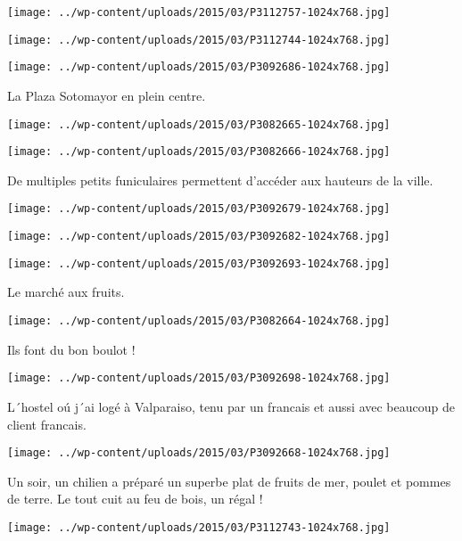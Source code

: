 \centerline{\texttt{[image: ../wp-content/uploads/2015/03/P3112757-1024x768.jpg]} } 
 \newline
\centerline{\texttt{[image: ../wp-content/uploads/2015/03/P3112744-1024x768.jpg]} } 
 \newline
\centerline{\texttt{[image: ../wp-content/uploads/2015/03/P3092686-1024x768.jpg]} } 
 \newline
 La Plaza Sotomayor en plein centre. \newline
 \newline
\centerline{\texttt{[image: ../wp-content/uploads/2015/03/P3082665-1024x768.jpg]} } 
 \newline
\centerline{\texttt{[image: ../wp-content/uploads/2015/03/P3082666-1024x768.jpg]} } 
 \newline
 De multiples petits funiculaires permettent d'accéder aux hauteurs de la ville. \newline
 \newline
\centerline{\texttt{[image: ../wp-content/uploads/2015/03/P3092679-1024x768.jpg]} } 
 \newline
\centerline{\texttt{[image: ../wp-content/uploads/2015/03/P3092682-1024x768.jpg]} } 
 \newline
\centerline{\texttt{[image: ../wp-content/uploads/2015/03/P3092693-1024x768.jpg]} } 
Le marché aux fruits. \newline
 \newline
\centerline{\texttt{[image: ../wp-content/uploads/2015/03/P3082664-1024x768.jpg]} } 
Ils font du bon boulot !\newline
\centerline{\texttt{[image: ../wp-content/uploads/2015/03/P3092698-1024x768.jpg]} } 
 \newline
 L´hostel oú j´ai logé à Valparaiso, tenu par un francais et aussi avec beaucoup de client francais. \newline
 \newline
\centerline{\texttt{[image: ../wp-content/uploads/2015/03/P3092668-1024x768.jpg]} } 
 \newline
 Un soir, un chilien a préparé un superbe plat de fruits de mer, poulet et pommes de terre. Le tout cuit au feu de bois, un régal ! \newline
 \newline
\centerline{\texttt{[image: ../wp-content/uploads/2015/03/P3112743-1024x768.jpg]} } 
